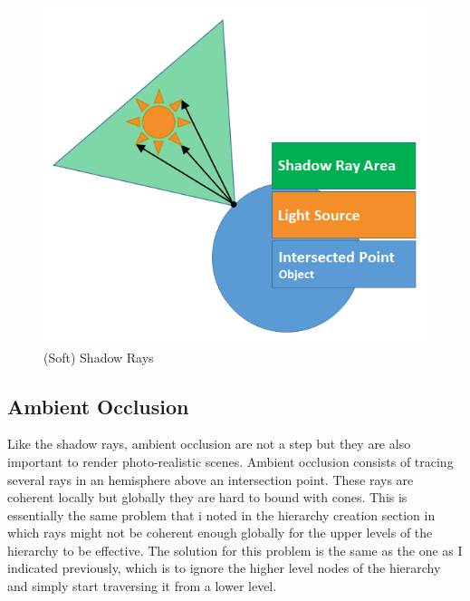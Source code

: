 \documentclass{llncs}
\begin{document}
\begin{figure}
\centering
\includegraphics[scale=0.40]{images/figure 16.png}
\caption{(Soft) Shadow Rays}
\end{figure}

%
\subsection{Ambient Occlusion}
%

Like the shadow rays, ambient occlusion are not a step but they are also important to render photo-realistic scenes. Ambient occlusion consists of tracing several rays in an hemisphere above an intersection point. These rays are coherent locally but globally they are hard to bound with cones. This is essentially the same problem that i noted in the hierarchy creation section in which rays might not be coherent enough globally for the upper levels of the hierarchy to be effective. The solution for this problem is the same as the one as I indicated previously, which is to ignore the higher level nodes of the hierarchy and simply start traversing it from a lower level.

\vspace*{-20pt}
\end{document}
